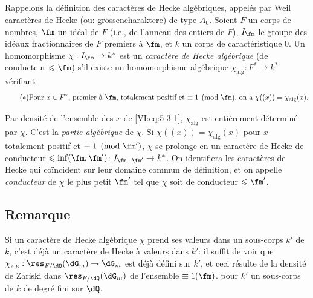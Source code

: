 \subsection{}\label{VI:5-3}

Rappelons la définition des caractères de Hecke algébriques, appelés 
par Weil caractères de Hecke (ou: gr\"ossencharaktere) de type $A_0$. Soient $F$ 
un corps de nombres, $\fm$ un idéal de $F$ (i.e., de l'anneau des entiers de 
$F$), $I_\fm$ le groupe des idéaux fractionnaires de $F$ premiers à $\fm$, 
et $k$ un corps de caractéristique $0$. Un homomorphisme 
$\chi:I_\fm \to k^\ast$ est un \emph{caractère de Hecke algébrique} (de 
conducteur $\leqslant \fm$) s'il existe un homomorphisme algébrique 
$\chi_\text{alg}:F^\ast \to k^\ast$ vérifiant 
\begin{equation*}\tag{$*$}\label{VI:eq:5-3-1}
\text{Pour $x\in F^\ast$, premier à $\fm$, totalement positif et 
$\equiv 1\pmod\fm$, on a $\chi((x))=\chi_\text{alg}(x)$.}
\end{equation*}

Par densité de l'ensemble des $x$ de \eqref{VI:eq:5-3-1}, $\chi_\text{alg}$ 
est entièrement déterminé par $\chi$. C'est la \emph{partie algébrique} 
de $\chi$. Si $\chi((x))=\chi_\text{alg}(x)$ pour $x$ totalement positif et 
$\equiv 1\pmod{\fm'}$, $\chi$ se prolonge en un caractère de Hecke de 
conducteur $\leqslant \inf(\fm,\fm')$: $I_{\fm+\fm'}\to k^\ast$. On 
identifiera les caractères de Hecke qui coïncident sur leur domaine commun de 
définition, et on appelle \emph{conducteur} de $\chi$ le plus petit $\fm'$ 
tel que $\chi$ soit de conducteur $\leqslant \fm'$. 





\subsection{Remarque}\label{VI:5-4}

Si un caractère de Hecke algébrique $\chi$ prend ses valeurs dans un 
sous-corps $k'$ de $k$, c'est déjà un caractère de Hecke à valeurs dans 
$k'$: il suffit de voir que $\chi_\text{alg}:\res_{F/\dQ}(\dG_m) \to \dG_m$ 
est déjà défini sur $k'$, et ceci résulte de la densité de Zariski 
dans $\res_{F/\dQ}(\dG_m)$ de l'ensemble  
$\equiv 1(\fm)$.  pour $k'$ un sous-corps de $k$ de 
degré fini sur $\dQ$. 





